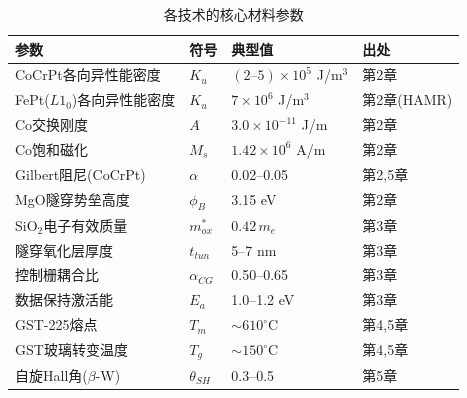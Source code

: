 \documentclass[11pt,a4paper,openany]{book}
\theoremstyle{definition}
\theoremstyle{plain}
\theoremstyle{remark}
\begin{document}
\begin{table}[H]
\centering
\caption{各技术的核心材料参数}
\begin{tabular}{@{}llll@{}}
\toprule
参数 & 符号 & 典型值 & 出处 \\
\midrule
CoCrPt各向异性能密度 & $K_u$ & $(2\text{--}5)\times 10^5$ J/m$^3$ & 第2章 \\
FePt($L1_0$)各向异性能密度 & $K_u$ & $7\times 10^6$ J/m$^3$ & 第2章(HAMR) \\
Co交换刚度 & $A$ & $3.0\times 10^{-11}$ J/m & 第2章 \\
Co饱和磁化 & $M_s$ & $1.42 \times 10^6$ A/m & 第2章 \\
Gilbert阻尼(CoCrPt) & $\alpha$ & 0.02--0.05 & 第2,5章 \\
MgO隧穿势垒高度 & $\phi_B$ & 3.15 eV & 第2章 \\
SiO$_2$电子有效质量 & $m_{ox}^*$ & $0.42\,m_e$ & 第3章 \\
隧穿氧化层厚度 & $t_{tun}$ & 5--7 nm & 第3章 \\
控制栅耦合比 & $\alpha_{CG}$ & 0.50--0.65 & 第3章 \\
数据保持激活能 & $E_a$ & 1.0--1.2 eV & 第3章 \\
GST-225熔点 & $T_m$ & $\sim 610^\circ$C & 第4,5章 \\
GST玻璃转变温度 & $T_g$ & $\sim 150^\circ$C & 第4,5章 \\
自旋Hall角($\beta$-W) & $\theta_{SH}$ & 0.3--0.5 & 第5章 \\
\bottomrule
\end{tabular}
\end{table}
\end{document}
